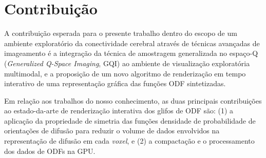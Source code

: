 \documentclass[
    12pt,                %
    oneside,            %
    a4paper,            %
    english,            %
    french,                %
    spanish,            %
    brazil                %
    ]{abntex2}
\begin{document}













\section{Contribuição}
\label{sec:contribuicoes}

A contribuição esperada para o presente trabalho dentro do escopo de um ambiente exploratório da conectividade cerebral através de técnicas avançadas de imageamento é a integração da técnica de amostragem generalizada no espaço-Q (\textit{Generalized Q-Space Imaging}, GQI) \cite{yeh2010}  ao ambiente de visualização exploratória multimodal, e a proposição de um novo algoritmo de renderização em tempo interativo de uma representação gráfica das funções ODF sintetizadas.

Em relação aos trabalhos do nosso conhecimento, as duas principais contribuições ao estado-da-arte de renderização interativa dos glifos de ODF são: (1) a aplicação da propriedade de simetria das funções densidade de probabilidade de orientações de difusão para reduzir o volume de dados envolvidos na representação de difusão em cada \textit{voxel}, e (2) a compactação e o processamento dos dados de ODFs na GPU.
\end{document}
